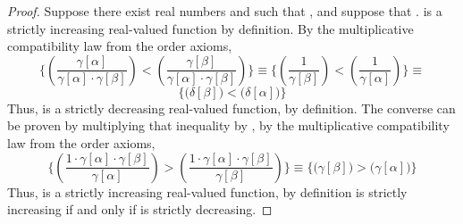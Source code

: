 \documentclass[preview]{standalone}
\begin{document}
\begin{proof}
    Suppose there exist real numbers \bm{$\alpha$} and \bm{$\beta$} such that 
    \bm{$\alpha < \beta$}, 
    and suppose that \bm{$\gamma[\alpha] < \gamma[\beta]$}. 
    \bm{$\gamma$} is a strictly increasing real-valued function by definition.
    By the multiplicative compatibility law from the order axioms, 
    \begin{equation*}
        \Bigg\{
            \left(
                \frac{\gamma[\alpha]}{\gamma[\alpha] \cdot \gamma[\beta]} 
            \right)
                    < 
            \left(
                \frac{\gamma[\beta]}{\gamma[\alpha] \cdot \gamma[\beta]}
            \right)
        \Bigg\}
            \equiv
        \Bigg\{
            \left(
                \frac{1}{\gamma[\beta]}
            \right)
                <
            \left(
                \frac{1}{\gamma[\alpha]}
            \right)
        \Bigg\}
            \equiv
    \end{equation*}
    \begin{equation*}
        \Bigg\{
            \bigg( \delta[\beta] \bigg)
                < 
            \bigg( \delta[\alpha] \bigg)
        \Bigg\}
    \end{equation*}
    Thus, \bm{$\delta$} is a strictly decreasing real-valued function,
    by definition. The converse can be proven by multiplying that inequality
    \bm{$\delta[\alpha] > \delta[\beta]$} by \bm{$\gamma[\alpha]\gamma[\beta]$},
    by the multiplicative compatibility law from the order axioms,
    \begin{equation*}
        \Bigg\{
            \left(
                \frac{1 \cdot \gamma[\alpha] \cdot \gamma[\beta]}{\gamma[\alpha]}
            \right)
                >
            \left(
                \frac{1 \cdot \gamma[\alpha] \cdot \gamma[\beta]}{\gamma[\beta]}
            \right)
        \Bigg\}
            \equiv
        \Bigg\{
            \bigg( \gamma[\beta] \bigg) 
                > 
            \bigg( \gamma[\alpha] \bigg)
        \Bigg\}
    \end{equation*}
    Thus, \bm{$\gamma$} is a strictly increasing real-valued function, by definition
    \bm{$\therefore \text{\space} \gamma[\alpha]$} is strictly increasing 
    if and only if 
    \bm{$\delta[\alpha]$} is strictly decreasing.
\end{proof}

    
\end{document}
